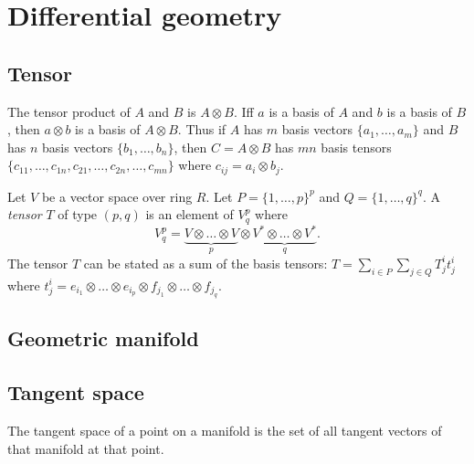 \chapter{Differential geometry}

\section{Tensor}

\cite{wptensor}

The tensor product of \(A\) and \(B\) is \(A \otimes B\).
Iff \(a\) is a basis of \(A\) and \(b\) is a basis of \(B\),
then \(a \otimes b\) is a basis of \(A \otimes B\).
Thus if \(A\) has \(m\) basis vectors \(\{a_1,\ldots,a_m\}\) and \(B\) has \(n\) basis vectors \(\{b_1,\ldots,b_n\}\),
then \(C = A \otimes B\) has \(mn\) basis tensors \(\{c_{11}, \ldots, c_{1n}, c_{21}, \ldots, c_{2n}, \ldots, c_{mn}\}\)
where \(c_{ij} = a_i \otimes b_j\).

Let \(V\) be a vector space over ring \(R\).
Let \(P = \{1,\ldots,p\}^p\) and \(Q = \{1,\ldots,q\}^q\).
A \emph{tensor} \(T\) of type \((p,q)\) is an element of
\(V_q^p\) where
\[
    V_q^p = \underbrace{V \otimes \ldots \otimes V}_p \otimes \underbrace{V^* \otimes \ldots \otimes V^*}_q.
\]
The tensor \(T\) can be stated as a sum of the basis tensors:
\( T = \sum_{i \in P} \sum_{j \in Q} T_j^i t_j^i \)
where \(t_j^i = e_{i_1} \otimes \ldots \otimes e_{i_p} \otimes f_{j_1} \otimes \ldots \otimes f_{j_q}\).

\section{Geometric manifold}

\section{Tangent space}

The tangent space of a point on a manifold is the set of all tangent vectors of that manifold at that point.
